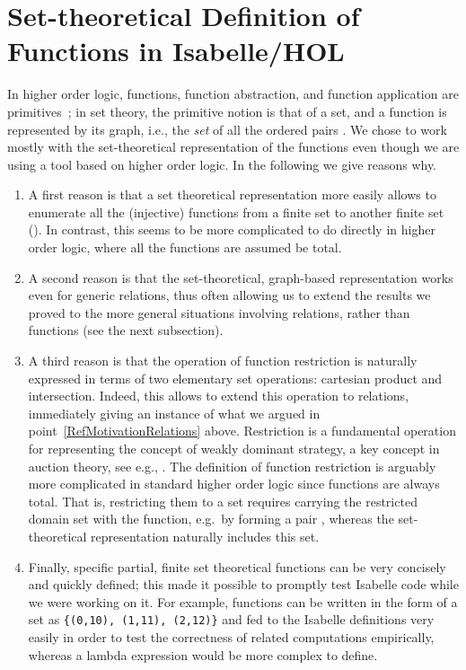 \documentclass[
]{llncs}
\newcommand{\hol}{higher order logic}
\newcommand{\I}{Isabelle}
\begin{document}
\section{Set-theoretical Definition of Functions in \I{}/HOL}
\label{RefFuncAsGraph}
In \hol{}, functions, function abstraction, and function application are primitives~\cite{bowen1994z};
in set theory, the primitive notion is that of a set, and a function  is represented by its graph, i.e., the \emph{set} of all the ordered pairs .
We chose to work mostly with the set-theoretical representation of the functions even though we are using a tool based on \hol{}. In the following we give reasons why.
\begin{enumerate}
\item
\label{RefMotivationEnumeration}
A first reason is that a set theoretical representation more easily allows to enumerate all the (injective) functions from a finite set to another finite set (\cite{CKLR:SoundCombVickCode13}).
In contrast, this seems to be more complicated to do directly in \hol, where all the functions are assumed be total.
\item
\label{RefMotivationRelations}
A second reason is that the set-theoretical, graph-based representation works even for generic relations, thus often allowing us to extend the results we proved to the more general situations involving relations, rather than functions (see the next subsection).
\item
\label{RefMotivationRestriction}
A third reason is that the operation of function restriction is naturally expressed in terms of two elementary set operations: cartesian product and intersection. Indeed, this allows to extend this operation to relations, immediately giving an instance of what we argued in point~\eqref{RefMotivationRelations} above.
Restriction is a fundamental operation for representing the concept of weakly dominant strategy, a key concept in auction theory, see e.g., \cite[proposition~2]{mas-04}.
The definition of function restriction is arguably more complicated in standard \hol{} since functions are always total. That is, restricting them to a set requires carrying the restricted domain set with the function, e.g.\ by forming a pair , whereas the set-theoretical representation naturally includes this set.
\item
Finally, specific partial, finite set theoretical functions can be very concisely and quickly defined; this made it possible to  prompt\-ly test \I{} code while we were working on it.
For example, functions can be written in the form of a set as \verb|{(0,10), (1,11), (2,12)}|  and fed to the \I{} definitions very easily in order to test the correctness of related computations empirically, whereas a lambda expression would be more complex to define.
\end{enumerate}
\end{document}
